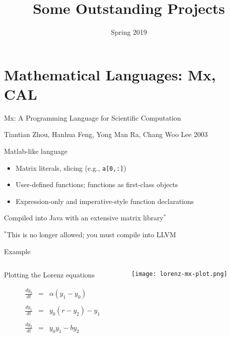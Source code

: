 \documentclass{plt}
\title{Some Outstanding Projects}
\institute{Columbia University}
\date{Spring 2019}
\begin{document}
\frame{\titlepage}

\frame{\tableofcontents}

\section{Mathematical Languages: Mx, CAL}
\begin{frame}[fragile]{Mx: A Programming Language for Scientific Computation}

{\small Tiantian Zhou, Hanhua Feng, Yong Man Ra, Chang Woo Lee 2003}

Matlab-like language

\begin{itemize}
\item Matrix literals, slicing (e.g., \verb|a[0,:]|)
\item User-defined functions; functions as first-class objects
\item Expression-only and imperative-style function declarations
\end{itemize}

Compiled into Java with an extensive matrix library$^*$

$^*$This is no longer allowed; you must compile into LLVM

\end{frame}

\begin{frame}{Example}

\begin{columns}
\begin{column}{0.5\textwidth}

Plotting the Lorenz equations

\begin{eqnarray*}
\frac{dy_0}{dt} &=& \alpha(y_1-y_0) \\
\\
\frac{dy_1}{dt} &=& y_0(r-y_2) - y_1 \\
\\
\frac{dy_2}{dt} &=& y_0y_1 - by_2
\end{eqnarray*}
\end{column}
\begin{column}{0.5\textwidth}
\centerline{\texttt{[image: lorenz-mx-plot.png]}}
\end{column}
\end{columns}
\end{frame}
\end{document}
